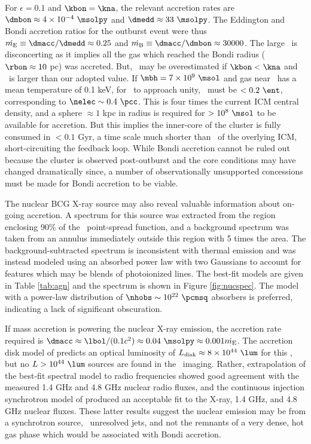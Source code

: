 \documentclass{emulateapj}
\begin{document}
For $\epsilon = 0.1$ and $\kbon = \kna$, the relevant accretion rates
are $\dmbon \approx 4 \times 10^{-4} ~\msolpy$ and $\dmedd \approx 33
~\msolpy$. The Eddington and Bondi accretion ratios for the outburst
event were thus $\dme \equiv \dmacc/\dmedd \approx 0.25$ and $\dmb
\equiv \dmacc/\dmbon \approx 30000$. The large \dmb\ is disconcerting
as it implies all the gas which reached the Bondi radius ($\rbon
\approx 10$ pc) was accreted. But, \dmb\ may be overestimated if
$\kbon < \kna$ and \mbh\ is larger than our adopted value. If $\mbh =
7 \times 10^9 ~\msol$ and gas near \rbon\ has a mean temperature of
0.1 keV, for \dmb\ to approach unity, \kbon\ must be $< 0.2 ~\ent$,
corresponding to $\nelec \sim 0.4 ~\pcc$. This is four times the
current ICM central density, and a sphere $\approx 1$ kpc in radius is
required for $> 10^8 ~\msol$ to be available for accretion. But this
implies the inner-core of the cluster is fully consumed in $< 0.1$
Gyr, a time scale much shorter than \tcool\ of the overlying ICM,
short-circuiting the feedback loop. While Bondi accretion cannot be
ruled out because the cluster is observed post-outburst and the core
conditions may have changed dramatically since, a number of
observationally unsupported concessions must be made for Bondi
accretion to be viable.

The nuclear BCG X-ray source may also reveal valuable information
about on-going accretion. A spectrum for this source was extracted
from the region enclosing 90\% of the \cxo\ point-spread function, and
a background spectrum was taken from an annulus immediately outside
this region with 5 times the area. The background-subtracted spectrum
is inconsistent with thermal emission and was instead modeled using an
absorbed power law with two Gaussians to account for features which
may be blends of photoionized lines. The best-fit models are given in
Table \ref{tab:agn} and the spectrum is shown in Figure
\ref{fig:nucspec}. The model with a power-law distribution of $\nhobs
\sim 10^{22} ~\pcmsq$ absorbers is preferred, indicating a lack of
significant obscuration.

If mass accretion is powering the nuclear X-ray emission, the
accretion rate required is $\dmacc \approx \lbol/(0.1 c^2) \approx
0.04 ~\msolpy \approx 0.001 \dme$. The accretion disk model of
\citet{2002NewAR..46..247M} predicts an optical luminosity of $\ldisk
\approx 8 \times 10^{44} ~\lum$ for this \dmacc, but no $L > 10^{44}
~\lum$ sources are found in the \hst\ imaging. Rather, extrapolation
of the best-fit spectral model to radio frequencies showed good
agreement with the measured 1.4 GHz and 4.8 GHz nuclear radio fluxes,
and the continuous injection synchrotron model of
\citet{1987MNRAS.225..335H} produced an acceptable fit to the X-ray,
1.4 GHz, and 4.8 GHz nuclear fluxes. These latter results suggest the
nuclear emission may be from a synchrotron source, \eg\ unresolved
jets, and not the remnants of a very dense, hot gas phase which would
be associated with Bondi accretion.
\end{document}
